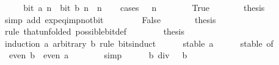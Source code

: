 \begin{isabellebody}
%
\isadelimproof
%
\endisadelimproof
%
\isatagproof
{}\isamarkupfalse%
\ {\isacharminus}{\kern0pt}\isanewline
\ \ \isamarkupfalse%
\ {\isacartoucheopen}bit\ a\ n\ {\isasymlongleftrightarrow}\ bit\ b\ n{\isacartoucheclose}\ \ n\isanewline
\ \ \isamarkupfalse%
\ {\isacharparenleft}{\kern0pt}cases\ {\isacartoucheopen}{}\ {\isacharcircum}{\kern0pt}\ n\ {\isacharequal}{\kern0pt}\ {}{\isacartoucheclose}{\isacharparenright}{\kern0pt}\isanewline
\ \ \ \ \isamarkupfalse%
\ True\isanewline
\ \ \ \ \isamarkupfalse%
\ \isamarkupfalse%
\ {\isacharquery}{\kern0pt}thesis\isanewline
\ \ \ \ \ \ \isamarkupfalse%
\ {\isacharparenleft}{\kern0pt}simp\ add{\isacharcolon}{\kern0pt}\ exp{\isacharunderscore}{\kern0pt}eq{\isacharunderscore}{\kern0pt}{}{\isacharunderscore}{\kern0pt}imp{\isacharunderscore}{\kern0pt}not{\isacharunderscore}{\kern0pt}bit{\isacharparenright}{\kern0pt}\isanewline
\ \ \isamarkupfalse%
\isanewline
\ \ \ \ \isamarkupfalse%
\ False\isanewline
\ \ \ \ \isamarkupfalse%
\ \isamarkupfalse%
\ {\isacharquery}{\kern0pt}thesis\isanewline
\ \ \ \ \ \ \isamarkupfalse%
\ {\isacharparenleft}{\kern0pt}rule\ that{\isacharbrackleft}{\kern0pt}unfolded\ possible{\isacharunderscore}{\kern0pt}bit{\isacharunderscore}{\kern0pt}def{\isacharbrackright}{\kern0pt}{\isacharparenright}{\kern0pt}\isanewline
\ \ \isamarkupfalse%
\isanewline
\ \ \isamarkupfalse%
\ \isamarkupfalse%
\ {\isacharquery}{\kern0pt}thesis\ \isamarkupfalse%
\ {\isacharparenleft}{\kern0pt}induction\ a\ arbitrary{\isacharcolon}{\kern0pt}\ b\ rule{\isacharcolon}{\kern0pt}\ bits{\isacharunderscore}{\kern0pt}induct{\isacharparenright}{\kern0pt}\isanewline
\ \ \ \ \isamarkupfalse%
\ {\isacharparenleft}{\kern0pt}stable\ a{\isacharparenright}{\kern0pt}\isanewline
\ \ \ \ \isamarkupfalse%
\ stable{\isacharparenleft}{\kern0pt}{}{\isacharparenright}{\kern0pt}\ {\isacharbrackleft}{\kern0pt}of\ {}{\isacharbrackright}{\kern0pt}\ \isamarkupfalse%
\ {\isacharasterisk}{\kern0pt}{\isacharasterisk}{\kern0pt}{\isacharcolon}{\kern0pt}\ {\isacartoucheopen}even\ b\ {\isasymlongleftrightarrow}\ even\ a{\isacartoucheclose}\isanewline
\ \ \ \ \ \ \isamarkupfalse%
\ simp\isanewline
\ \ \ \ \isamarkupfalse%
\ {\isacartoucheopen}b\ div\ {}\ {\isacharequal}{\kern0pt}\ b{\isacartoucheclose}\isanewline

\end{isabellebody}
